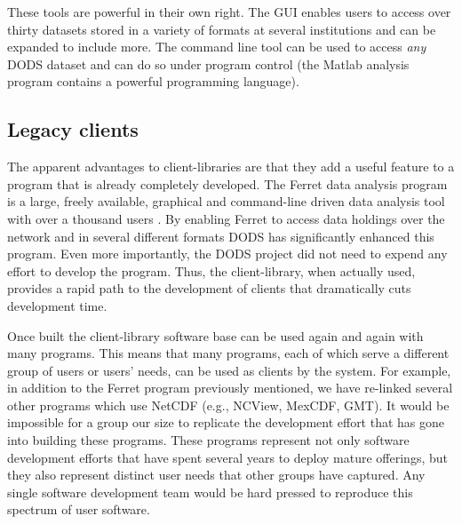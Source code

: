 \documentclass[12pt]{article}
\begin{document}
These tools are powerful in their own right. The \ac{GUI} enables users to
access over thirty datasets stored in a variety of formats at several
institutions and can be expanded to include more. The command line tool
can be used to access \emph{any} \ac{DODS} dataset and can do so under
program control (the Matlab analysis program contains a powerful programming
language).


\subsection{Legacy clients}
\label{lc}

The apparent advantages to client-libraries are that they add a useful
feature to a program that is already completely developed. The Ferret data
analysis program is a large, freely available, graphical and command-line
driven data analysis tool with over a thousand users \cite{ferret}. By
enabling Ferret to access data holdings over the network and in several
different formats \ac{DODS} has significantly enhanced this program. Even
more importantly, the \ac{DODS} project did not need to expend any effort to
develop the program. Thus, the client-library, when actually used, provides a
rapid path to the development of clients that dramatically cuts development
time.

Once built the client-library software base can be used again and again with
many programs. This means that many programs, each of which serve a different
group of users or users' needs, can be used as clients by the system. For
example, in addition to the Ferret program previously mentioned, we have
re-linked several other programs which use \acs{NetCDF} (e.g., NCView,
MexCDF, GMT). It would be impossible for a group our size to replicate the
development effort that has gone into building these programs.  These
programs represent not only software development efforts that have spent
several years to deploy mature offerings, but they also represent distinct
user needs that other groups have captured.  Any single software development
team would be hard pressed to reproduce this spectrum of user software.
\end{document}
